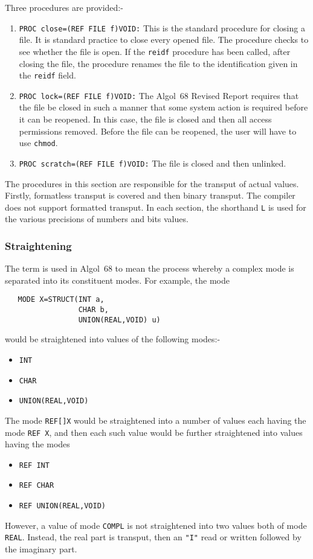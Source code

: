 \pagebreak
{}
Three procedures are provided:-
\begin{enumerate}
\item \verb|PROC close=(REF FILE f)VOID:|\newline
This is the standard procedure for closing a file. It is standard
practice to close every opened file. The procedure checks to see
whether the file is open. If the \verb|reidf| procedure has been
called, after closing the file, the procedure renames the file to the
identification given in the \verb|reidf| field.
\item \verb|PROC lock=(REF FILE f)VOID:|\newline
The Algol~68 Revised Report requires that the file be closed in such a
manner that some system action is required before it can be reopened.
In this case, the file is closed and then all access permissions
removed. Before the file can be reopened, the user will have to use
\verb|chmod|.
\item \verb|PROC scratch=(REF FILE f)VOID:|\newline
The file is closed and then unlinked.
\end{enumerate}

The procedures in this section are responsible for the trans\-put of
actual values. Firstly, formatless transput is covered and then binary
transput. The  compiler does not support formatted
transput. In each section, the shorthand \verb|L| is used for the
various precisions of numbers and bits values.

\subsubsection*{Straightening}
The term  is used in Algol~68 to mean the process
whereby a complex mode is separated into its constituent modes. For
example, the mode
\begin{verbatim}
   MODE X=STRUCT(INT a,
                 CHAR b,
                 UNION(REAL,VOID) u)
\end{verbatim}
\noindent
would be straightened into values of the following modes:-
\begin{itemize}
\item \verb|INT|
\item \verb|CHAR|
\item \verb|UNION(REAL,VOID)|
\end{itemize}
The mode \verb|REF[]X| would be straightened into a number of values
each having the mode \verb|REF X|, and then each such value would be
further straightened into values having the modes
\begin{itemize}
\item \verb|REF INT|
\item \verb|REF CHAR|
\item \verb|REF UNION(REAL,VOID)|
\end{itemize}
However, a value of mode \verb|COMPL| is not straightened into two
values both of mode \verb|REAL|. Instead, the real part is transput,
then an \verb|"I"| read or written followed by the imaginary part.

